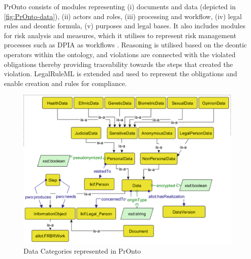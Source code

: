 PrOnto consists of modules representing (i) documents and data (depicted in \autoref{fig:PrOnto-data}), (ii) actors and roles, (iii) processing and workflow, (iv) legal rules and deontic formula, (v) purposes and legal bases. It also includes modules for risk analysis and measures, which it utilises to represent risk management processes such as DPIA as workflows \cite{palmirani_pronto:_2018}. Reasoning is utilised based on the deontic operators within the ontology, and violations are connected with the violated obligations thereby providing traceability towards the steps that created the violation. LegalRuleML is extended and used to represent the obligations and enable creation and rules for compliance.

\begin{figure}[htbp]
    \centering
    \includegraphics[width=\linewidth]{img/PrOnto_data.png}
    \caption{Data Categories represented in PrOnto \cite{palmirani_pronto:_2018}}
    \label{fig:PrOnto-data}
\end{figure}


